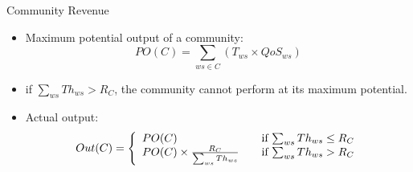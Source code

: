 \documentclass{beamer}
\begin{document}
\begin{frame}{Community Revenue}
    \begin{itemize}
        \item Maximum potential output of a community:
            \begin{equation*}
                PO(C) = \sum_{ws \in C}{(T_{ws} \times QoS_{ws})}
            \end{equation*}
        \item if $\sum_{ws}{Th_{ws}} > R_C$, the community cannot perform at its maximum potential.
        \item Actual output:
            \begin{equation}\label{out_c}
                Out(C) = \left\{
                  \begin{array}{l l}
                    PO(C) & \quad \text{if $\sum_{ws}{Th_{ws}} \leq R_{C}$}\\
                    PO(C) \times \frac{R_{C}}{\sum_{ws}{Th_{ws}}} & \quad \text{if $\sum_{ws}{Th_{ws}} > R_{C}$}
                  \end{array} \right.
            \end{equation}
    \end{itemize}
\end{frame}
\end{document}
